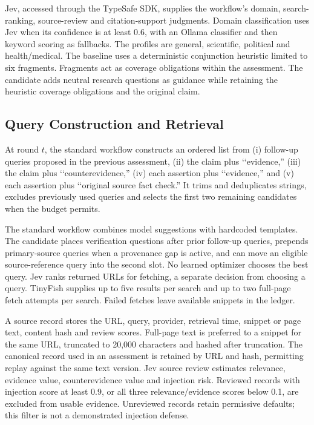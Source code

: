 \documentclass[conference]{IEEEtran}
\begin{document}
Jev, accessed through the TypeSafe SDK, supplies the workflow's domain, search-ranking, source-review and citation-support judgments. Domain classification uses Jev when its confidence is at least 0.6, with an Ollama classifier and then keyword scoring as fallbacks. The profiles are general, scientific, political and health/medical. The baseline uses a deterministic conjunction heuristic limited to six fragments. Fragments act as coverage obligations within the assessment. The candidate adds neutral research questions as guidance while retaining the heuristic coverage obligations and the original claim.

\subsection{Query Construction and Retrieval}
At round $t$, the standard workflow constructs an ordered list from (i) follow-up queries proposed in the previous assessment, (ii) the claim plus \lq\lq evidence,'' (iii) the claim plus \lq\lq counterevidence,'' (iv) each assertion plus \lq\lq evidence,'' and (v) each assertion plus \lq\lq original source fact check.'' It trims and deduplicates strings, excludes previously used queries and selects the first two remaining candidates when the budget permits.

The standard workflow combines model suggestions with hardcoded templates. The candidate places verification questions after prior follow-up queries, prepends primary-source queries when a provenance gap is active, and can move an eligible source-reference query into the second slot. No learned optimizer chooses the best query. Jev ranks returned URLs for fetching, a separate decision from choosing a query. TinyFish supplies up to five results per search and up to two full-page fetch attempts per search. Failed fetches leave available snippets in the ledger.

A source record stores the URL, query, provider, retrieval time, snippet or page text, content hash and review scores. Full-page text is preferred to a snippet for the same URL, truncated to 20,000 characters and hashed after truncation. The canonical record used in an assessment is retained by URL and hash, permitting replay against the same text version. Jev source review estimates relevance, evidence value, counterevidence value and injection risk. Reviewed records with injection score at least 0.9, or all three relevance/evidence scores below 0.1, are excluded from usable evidence. Unreviewed records retain permissive defaults; this filter is not a demonstrated injection defense.
\end{document}
